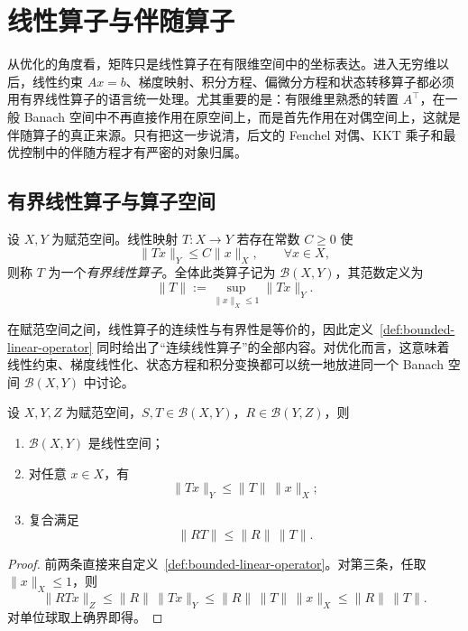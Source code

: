 \section{线性算子与伴随算子}

\label{sec:3-3}

从优化的角度看，矩阵只是线性算子在有限维空间中的坐标表达。进入无穷维以后，线性约束 $Ax=b$、梯度映射、积分方程、偏微分方程和状态转移算子都必须用有界线性算子的语言统一处理。尤其重要的是：有限维里熟悉的转置 $A^\top$，在一般 Banach 空间中不再直接作用在原空间上，而是首先作用在对偶空间上，这就是伴随算子的真正来源。只有把这一步说清，后文的 Fenchel 对偶、KKT 乘子和最优控制中的伴随方程才有严密的对象归属。

\subsection{有界线性算子与算子空间}

\begin{definition}[有界线性算子]\label{def:bounded-linear-operator}
设 $X,Y$ 为赋范空间。线性映射 $T\colon X\to Y$ 若存在常数 $C\ge 0$ 使
\[
\|Tx\|_Y\le C\|x\|_X,\qquad \forall x\in X,
\]
则称 $T$ 为一个\emph{有界线性算子}。全体此类算子记为 $\mathcal B(X,Y)$，其范数定义为
\[
\|T\|:=\sup_{\|x\|_X\le 1}\|Tx\|_Y.
\]
\end{definition}

在赋范空间之间，线性算子的连续性与有界性是等价的，因此定义~\ref{def:bounded-linear-operator} 同时给出了“连续线性算子”的全部内容。对优化而言，这意味着线性约束、梯度线性化、状态方程和积分变换都可以统一地放进同一个 Banach 空间 $\mathcal B(X,Y)$ 中讨论。

\begin{proposition}[算子范数的基本性质]
设 $X,Y,Z$ 为赋范空间，$S,T\in \mathcal B(X,Y)$，$R\in \mathcal B(Y,Z)$，则
\begin{enumerate}
  \item $\mathcal B(X,Y)$ 是线性空间；
  \item 对任意 $x\in X$，有
  \[
  \|Tx\|_Y\le \|T\|\,\|x\|_X ;
  \]
  \item 复合满足
  \[
  \|RT\|\le \|R\|\,\|T\|.
  \]
\end{enumerate}
\end{proposition}

\begin{proof}
前两条直接来自定义~\ref{def:bounded-linear-operator}。对第三条，任取 $\|x\|_X\le 1$，则
\[
\|RTx\|_Z\le \|R\|\,\|Tx\|_Y\le \|R\|\,\|T\|\,\|x\|_X\le \|R\|\,\|T\|.
\]
对单位球取上确界即得。
\end{proof}


